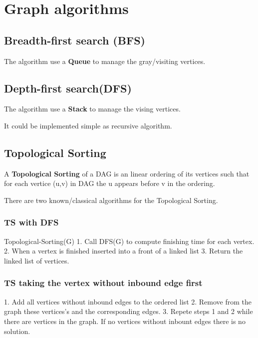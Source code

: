\chapter{Graph algorithms}
\section{Breadth-first search (BFS)}
The algorithm use a \textbf{Queue} to manage the gray/visiting vertices. 

\section{Depth-first search(DFS)}
The algorithm use a \textbf{Stack} to manage the vising vertices.

It could be implemented simple as recursive algorithm.

\section{Topological Sorting}

A \textbf{Topological Sorting} of a DAG is an linear ordering of its vertices such that for each vertice (u,v) in DAG the u appears before v in the ordering.


There are two known/classical algorithms for the Topological Sorting.

\subsection{TS with DFS}

Topological-Sorting(G)
1. Call DFS(G) to compute finishing time for each vertex.
2. When a vertex is finished inserted into a front of a linked list
3. Return the linked list of vertices.

\subsection{TS taking the vertex without inbound edge first}

1. Add all vertices without inbound edges to the ordered list
2. Remove from the graph these vertices's and the corresponding edges.
3. Repete steps 1 and 2 while there are vertices in the graph. If no vertices without inbount edges there is no solution.